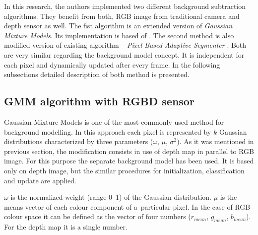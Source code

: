 \documentclass[b5paper,10pt,twoside]{article}
\begin{document}
{In this research, the authors implemented two different background subtraction algorithms. They benefit from both, RGB image from traditional camera and depth sensor as well. The fist algorithm is an extended version of \textit{Gaussian Mixture Models}. Its implementation is based of \cite{}. The second method is also modified version of existing algorithm -- \textit{Pixel Based Adaptive Segmenter} \cite{}. Both are very similar regarding the background model concept. It is independent for each pixel and dynamically updated after every frame. In the following subsections detailed description of both method is presented. 


\subsection{GMM algorithm with RGBD sensor}
\label{subsec:gmm_rgbd}

Gaussian Mixture Models is one of the most commonly used method for background modelling. 
In this approach each pixel is represented by $k$ Gaussian distributions characterized by three parameters ($\omega$, $\mu$, $\sigma^2$). As it was mentioned in previous section, the modification consists in use of depth map in parallel to RGB image. For this purpose the separate background model has been used. It is based only on depth image, but the similar procedures for initialization, classification and update are applied.


$\omega$ is the normalized weight (range 0--1) of the Gaussian distribution.
$\mu$ is the means vector of each colour component of a~particular pixel. 
In the case of RGB colour space it can be defined as the vector of four numbers ($r_{mean}$, $g_{mean}$, $b_{mean}$).
For the depth map it is a single number. 

}
\end{document}
